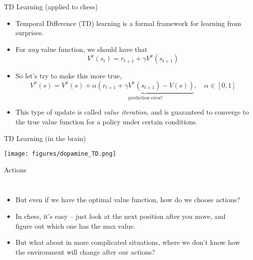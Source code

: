 \documentclass{beamer}
\begin{document}
\begin{frame}{TD Learning (applied to chess)}
\begin{itemize}
    \item<1-> Temporal Difference (TD) learning is a formal framework for learning from surprises. 
    \item<2-> For \emph{any} value function, we should have that
        \[V^{\pi}(s_{t}) = r_{t+1} + \gamma V^{\pi}(s_{t+1})\] 
    \item<3-> So let's try to make this more true, 
        \[V^{\pi}(s) = V^{\pi}(s) + \alpha \underbrace{\left( r_{t+1} + \gamma V^{\pi}(s_{t+1}) - V(s)\right)}_{\text{prediction error!}}, \quad \alpha \in [0, 1]\]
    \item<4-> This type of update is called \emph{value iteration}, and is guaranteed to converge to the true value function for a policy under certain conditions.
\end{itemize}
\end{frame}

\begin{frame}{TD Learning (in the brain)}

\begin{center}
\texttt{[image: figures/dopamine\_TD.png]}
\end{center}
\end{frame}

\begin{frame}{Actions}
\begin{columns}
\begin{itemize}
    \item<1-> But even if we have the optimal value function, how do we choose actions? 
    \item<2-> In chess, it's easy -- just look at the next position after you move, and figure out which one has the max value.
    \item<3-> But what about in more complicated situations, where we don't know how the environment will change after our actions?
\end{itemize}
    \begin{center}
    \end{center}
\end{columns}
\end{frame}
\end{document}
